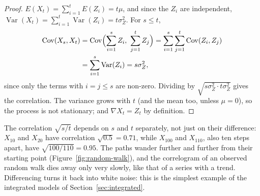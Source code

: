 \documentclass[11pt,a4paper]{article}
\theoremstyle{definition}
\DeclareMathOperator{\Var}{Var}
\DeclareMathOperator{\Cov}{Cov}
\begin{document}
\begin{proof}
$E(X_t) = \sum_{i=1}^tE(Z_i) = t\mu$, and since the $Z_i$ are independent, $\Var(X_t) = \sum_{i=1}^t\Var(Z_i) = t\sigma_Z^2$. For $s \le t$,
\begin{align*}
\Cov(X_s, X_t) &= \Cov\Bigl(\sum_{i=1}^sZ_i, \ \sum_{j=1}^tZ_j\Bigr) = \sum_{i=1}^s\sum_{j=1}^t\Cov(Z_i, Z_j) \\
&= \sum_{i=1}^s\Var(Z_i) = s\sigma_Z^2 ,
\end{align*}
since only the terms with $i = j \le s$ are non-zero. Dividing by $\sqrt{s\sigma_Z^2 \cdot t\sigma_Z^2}$ gives the correlation. The variance grows with $t$ (and
the mean too, unless $\mu = 0$), so the process is not stationary; and $\nabla X_t = Z_t$ by definition.
\end{proof}

The correlation $\sqrt{s/t}$ depends on $s$ and $t$ separately, not just on their difference: $X_{10}$ and $X_{20}$ have correlation
$\sqrt{0.5} = 0.71$, while $X_{100}$ and $X_{110}$, also ten steps apart, have $\sqrt{100/110} = 0.95$. The paths wander further and
further from their starting point (Figure~\ref{fig:random-walk}), and the correlogram of an observed random walk
dies away only very slowly, like that of a series with a trend. Differencing turns it back into white noise:
this is the simplest example of the integrated models of Section~\ref{sec:integrated}.
\end{document}
